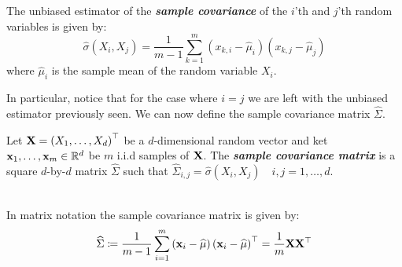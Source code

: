 \begin{definition}
The unbiased estimator of the \textbf{\textit{sample covariance}} of the $i$'th and $j$'th random variables is given by:
$$\widehat{\sigma}\left(X_i, X_j\right) = \frac{1}{m-1} \sum^{m}_{k=1}{(x_{k,i}-\widehat{\mu}_i)(x_{k,j}-\widehat{\mu}_j)}$$
where $\widehat{\mu}_i$ is the sample mean of the random variable $X_i$.
\end{definition}
 
In particular, notice that for the case where $i=j$ we are left with the unbiased estimator previously seen. We can now define the sample covariance matrix $\widehat{\Sigma}$.

\begin{definition}
Let $\mathbf{X}=\left(X_1,\ldots,X_d\right)^\top$ be a $d$-dimensional random vector and ket $\mathbf{x}_1,\ldots,\mathbf{x}_m\in\mathbb{R}^d$ be $m$ i.i.d samples of $\mathbf{X}$. The \textbf{\textit{sample covariance matrix}} is a square $d$-by-$d$ matrix $\widehat{\Sigma}$ such that $\widehat{\Sigma}_{i,j}=\widehat{\sigma}\left(X_{i},X_{j}\right)\quad i,j=1,\ldots,d$.

~\\In matrix notation the sample covariance matrix is given by:
$$ \widehat{\Sigma} \coloneqq \frac{1}{m-1} \sum^{m}_{i=1}\left(\mathbf{x}_i-\widehat{\mu}\right)\left(\mathbf{x}_i-\widehat{\mu}\right)^\top = \frac{1}{m}\mathbf{X}\mathbf{X}^\top $$
\end{definition}

